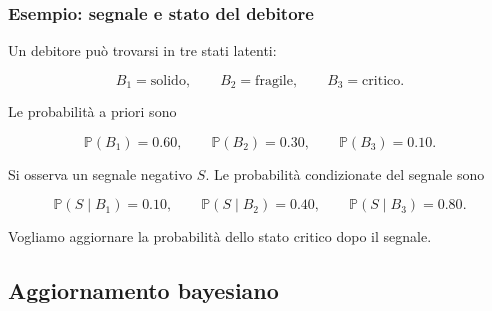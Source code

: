 \documentclass[handout]{beamer}%
\providecommand{\Prob}{\mathbb{P}}
\providecommand{\1}{\mathbf{1}}
\providecommand{\QTR}[2]{\csname #1\endcsname{#2}}
\begin{document}
\begin{frame}%
%

\frametitle{Esempio: segnale e stato del debitore}%


Un debitore pu\`{o} trovarsi in tre stati latenti:%

\[
B_{1}=\text{solido},\qquad B_{2}=\text{fragile},\qquad B_{3}=\text{critico}.
\]


\medskip

Le probabilit\`{a} a priori sono%

\[
\Prob(B_{1})=0.60,\qquad\Prob(B_{2})=0.30,\qquad\Prob(B_{3})=0.10.
\]


\medskip

Si osserva un segnale negativo $S$. Le probabilit\`{a} condizionate del
segnale sono%

\[
\Prob(S\mid B_{1})=0.10,\qquad\Prob(S\mid B_{2})=0.40,\qquad\Prob(S\mid
B_{3})=0.80.
\]


\medskip

Vogliamo aggiornare la probabilit\`{a} dello stato critico dopo il segnale.%

\transboxout
\end{frame}%




\subsection{Aggiornamento bayesiano}%
\end{document}
